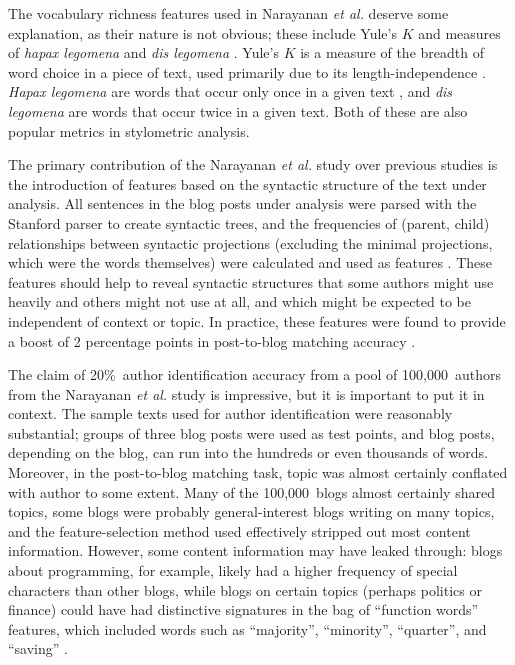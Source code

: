 \documentclass[12pt]{article}
\begin{document}
The vocabulary richness features used in Narayanan \textit{et al.} deserve some explanation, as their nature is not obvious; these include Yule's $K$ and measures of \textit{hapax legomena} and \textit{dis legomena} \cite{narayanan2012feasibility}. Yule's $K$ is a measure of the breadth of word choice in a piece of text, used primarily due to its length-independence \cite{miranda2005yule}. \textit{Hapax legomena} are words that occur only once in a given text \cite{oxford2012oxford}, and \textit{dis legomena} are words that occur twice in a given text. Both of these are also popular metrics in stylometric analysis.

The primary contribution of the Narayanan \textit{et al.} study over previous studies \cite{abbasi2008writeprints} is the introduction of features based on the syntactic structure of the text under analysis. All sentences in the blog posts under analysis were parsed with the Stanford parser to create syntactic trees, and the frequencies of (parent, child) relationships between syntactic projections (excluding the minimal projections, which were the words themselves) were calculated and used as features \cite{klein2003accurate, narayanan2012feasibility}. These features should help to reveal syntactic structures that some authors might use heavily and others might not use at all, and which might be expected to be independent of context or topic. In practice, these features were found to provide a boost of 2 percentage points in post-to-blog matching accuracy \cite{narayanan2012feasibility}.

The claim of 20\%~author identification accuracy from a pool of 100,000~authors from the Narayanan \textit{et al.} study is impressive, but it is important to put it in context. The sample texts used for author identification were reasonably substantial; groups of three blog posts were used as test points, and blog posts, depending on the blog, can run into the hundreds or even thousands of words. Moreover, in the post-to-blog matching task, topic was almost certainly conflated with author to some extent. Many of the 100,000~blogs almost certainly shared topics, some blogs were probably general-interest blogs writing on many topics, and the feature-selection method used effectively stripped out most content information. However, some content information may have leaked through: blogs about programming, for example, likely had a higher frequency of special characters than other blogs, while blogs on certain topics (perhaps politics or finance) could have had distinctive signatures in the bag of ``function words'' features, which included words such as ``majority'', ``minority'', ``quarter'', and ``saving'' \cite{narayanan2012feasibility}.
\end{document}
